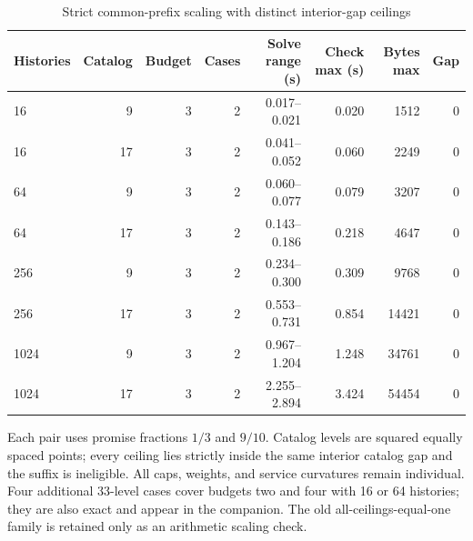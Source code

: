 \begin{table}[p]
\centering\small
\setlength{\tabcolsep}{3.5pt}
\caption{Strict common-prefix scaling with distinct interior-gap ceilings}\label{tab:r51-strict}
\begin{tabular}{lrrrrrrr}
\toprule
Histories & Catalog & Budget & Cases & Solve range (s) & Check max (s) & Bytes max & Gap \\
\midrule
16 & 9 & 3 & 2 & 0.017--0.021 & 0.020 & 1512 & 0 \\
16 & 17 & 3 & 2 & 0.041--0.052 & 0.060 & 2249 & 0 \\
64 & 9 & 3 & 2 & 0.060--0.077 & 0.079 & 3207 & 0 \\
64 & 17 & 3 & 2 & 0.143--0.186 & 0.218 & 4647 & 0 \\
256 & 9 & 3 & 2 & 0.234--0.300 & 0.309 & 9768 & 0 \\
256 & 17 & 3 & 2 & 0.553--0.731 & 0.854 & 14421 & 0 \\
1024 & 9 & 3 & 2 & 0.967--1.204 & 1.248 & 34761 & 0 \\
1024 & 17 & 3 & 2 & 2.255--2.894 & 3.424 & 54454 & 0 \\
\bottomrule
\end{tabular}
\par\smallskip\begin{minipage}{\textwidth}\footnotesize Each pair uses promise fractions $1/3$ and $9/10$. Catalog levels are squared equally spaced points; every ceiling lies strictly inside the same interior catalog gap and the suffix is ineligible. All caps, weights, and service curvatures remain individual. Four additional 33-level cases cover budgets two and four with 16 or 64 histories; they are also exact and appear in the companion. The old all-ceilings-equal-one family is retained only as an arithmetic scaling check.\end{minipage}
\end{table}

